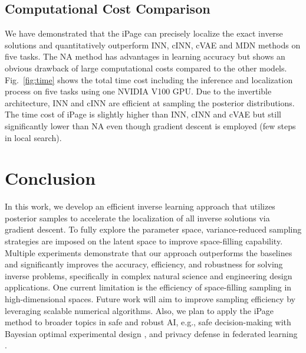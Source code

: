 \documentclass[letterpaper]{article} %
\begin{document}
\subsection{Computational Cost Comparison}
We have demonstrated that the iPage can precisely localize the exact inverse solutions and quantitatively outperform INN, cINN, cVAE and MDN methods on five tasks. The NA method has advantages in learning accuracy but shows an obvious drawback of large computational costs compared to the other models. Fig.~\ref{fig:time} shows the total time cost including the inference and localization process on five tasks using one NVIDIA V100 GPU. Due to the invertible architecture, INN and cINN are efficient at sampling the posterior distributions. The time cost of iPage is slightly higher than INN, cINN and cVAE but still significantly lower than NA even though gradient descent is employed (few steps in local search).

\section{Conclusion}
In this work, we develop an efficient inverse learning approach that utilizes posterior samples to accelerate the localization of all inverse solutions via gradient descent. To fully explore the parameter space, variance-reduced sampling strategies are imposed on the latent space to improve space-filling capability. Multiple experiments demonstrate that our approach outperforms the baselines and significantly improves the accuracy, efficiency, and robustness for solving inverse  problems, specifically in complex natural science and engineering design applications.  One current limitation is the efficiency of space-filling sampling in high-dimensional spaces.
Future work will aim to improve sampling efficiency by leveraging scalable numerical algorithms. Also, we plan to apply the iPage method to broader topics in safe and robust AI, e.g., safe decision-making with Bayesian optimal experimental design \cite{zhang2021scalable}, and privacy defense in federated learning \cite{li2022auditing}.
\end{document}
